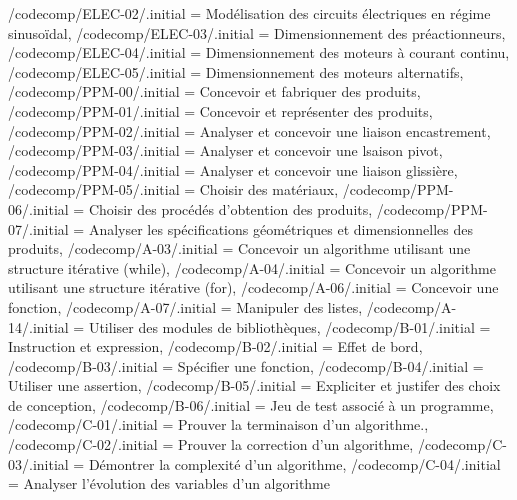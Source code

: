 {	/codecomp/ELEC-02/.initial = Modélisation des circuits électriques en régime sinusoïdal,
	/codecomp/ELEC-03/.initial = Dimensionnement des préactionneurs,
	/codecomp/ELEC-04/.initial = Dimensionnement des moteurs à courant continu,
	/codecomp/ELEC-05/.initial = Dimensionnement des moteurs alternatifs,
	/codecomp/PPM-00/.initial = Concevoir et fabriquer des produits,
	/codecomp/PPM-01/.initial = Concevoir et représenter des produits,
	/codecomp/PPM-02/.initial = Analyser et concevoir une liaison encastrement,
	/codecomp/PPM-03/.initial = Analyser et concevoir une lsaison pivot,
	/codecomp/PPM-04/.initial = Analyser et concevoir une liaison glissière,
	/codecomp/PPM-05/.initial = Choisir des matériaux,
	/codecomp/PPM-06/.initial = Choisir des procédés d'obtention des produits,
	/codecomp/PPM-07/.initial = Analyser les spécifications géométriques et dimensionnelles des produits,
	/codecomp/A-03/.initial = Concevoir un algorithme utilisant une structure itérative (while),
	/codecomp/A-04/.initial = Concevoir un algorithme utilisant une structure itérative (for),
	/codecomp/A-06/.initial = Concevoir une fonction,
	/codecomp/A-07/.initial = Manipuler des listes,
	/codecomp/A-14/.initial = Utiliser des modules de bibliothèques,
	/codecomp/B-01/.initial = Instruction et expression,
	/codecomp/B-02/.initial = Effet de bord,
	/codecomp/B-03/.initial = Spécifier une fonction,
	/codecomp/B-04/.initial = Utiliser une assertion,
	/codecomp/B-05/.initial = Expliciter et justifer des choix de conception,
	/codecomp/B-06/.initial = Jeu de test associé à un programme,
	/codecomp/C-01/.initial = Prouver la terminaison d'un algorithme.,
	/codecomp/C-02/.initial = Prouver la correction d'un algorithme,
	/codecomp/C-03/.initial = Démontrer la complexité d'un algorithme,
	/codecomp/C-04/.initial = Analyser l'évolution des variables d'un algorithme
}

\newcommand{\compForCodecomp}[2]{\xpComp{#1}{#2} \pgfkeysvalueof{/codecomp/#1-#2}}


\newcommand{\deuxcolxp}[2]{
\begin{minipage}[c]{1cm} \xpComp{#1}{#2} \end{minipage} \hspace{.3cm} %
\begin{minipage}[c]{8cm} \pgfkeysvalueof{/codecomp/#1-#2}\end{minipage} \\ \vspace{-0.2cm} \\}



